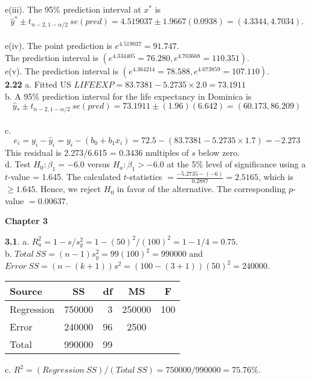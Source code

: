 e(iii). The 95\% prediction interval at $x^*$ is \begin{equation*}
\widehat{y}^{\ast } \pm t_{n-2,1-\alpha /2} ~se(pred) = 4.519037 \pm
1.9667(0.0938) = (4.3344, 4.7034).
\end{equation*}\\
e(iv).  The point prediction is $e^{4.519037}= 91.747$. \\
The prediction interval is $(e^{4.334405}=76.280,
e^{4.703668}=110.351 ).$\\
e(v).  The prediction interval is $(e^{4.364214}=78.588,
e^{4.673859}=107.110 ).$\\

\textbf{2.22}
a. Fitted US $LIFEEXP = 83.7381 - 5.2735 \times 2.0 = 73.1911$\\
b. A 95\% prediction interval for the life expectancy in Dominica is
\begin{equation*}
\widehat{y}_{\ast} \pm t_{n-2,1-\alpha /2} ~se(pred)=73.1911\pm(1.96)(6.642)=(60.173, 86.209)
\end{equation*}\\
c. \begin{equation*} e_{i}=y_{i}-\widehat{y}_{i}=y_{i}-\left(
b_0+b_1x_{i}\right)= 72.5-(83.7381 - 5.2735 \times 1.7)=-2.273
\end{equation*}
This residual is 2.273/6.615 = 0.3436 multiples of $s$ below zero.\\
d. Test $H_0: \beta_1 = -6.0$ versus $H_a: \beta_1 > -6.0$ at the
5\% level of significance using a $t$-value = 1.645. The calculated
$t$-statistics $= \frac{-5.2735-(-6)}{0.2887}=2.5165$, which is
$\geq1.645$. Hence, we reject $H_0$ in favor of the alternative.
The corresponding $p$-value $=  0.00637$.\\

\begin{center}\large \textbf{Chapter 3}\end{center}

\textbf{3.1}. a. $R^2_a = 1 - s/{s^2_y} = 1 - {(50)^2}/{(100)^2} = 1 - 1/4 = 0.75.$\\
b. $Total ~SS =(n - 1)s^2_y = 99(100)^2 = 990000 $ and \\$Error ~SS
= (n - (k + 1))s^2 = (100 - (3 + 1))(50)^2 =
240000.$\\
\begin{center}\begin{tabular}{lcrcc}
 \hline
Source & SS & df & MS & F \\ \hline
Regression & 750000 & 3 & 250000 & 100 \\
Error & 240000 & 96 & 2500 & \\
Total & 990000 &99 && \\
 \hline\end{tabular}\end{center}
c. $R^2 = (Regression~SS)/(Total~SS) =750000/990000 = 75.76\%$.\\

